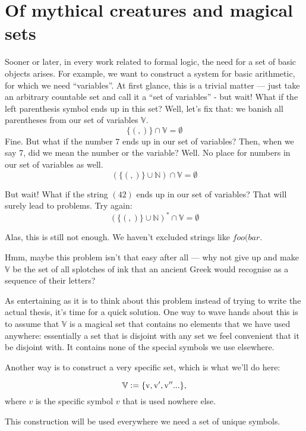 \documentclass[main.tex]{subfiles}
\begin{document}
\section{Of mythical creatures and magical sets}
\label{sec:magic}

Sooner or later, in every work related to formal logic, the need for
a set of basic objects arises. For example, we want to construct a system for basic
arithmetic, for which we need ``variables''.
At first glance, this is a trivial matter --- just take an arbitrary countable
set and call it a ``set of variables'' - but wait! What if the left parenthesis
symbol ends up in this set? Well, let's fix that: we banish all parentheses
from our set of variables $\mathbb{V}$.
\[ \{ (, ) \} \cap \mathbb{V} = \emptyset \]
Fine. But what if the number $7$ ends up in our set of variables? Then,
when we say 7, did we mean the number or the variable? Well. No place for
numbers in our set of variables as well.
\[ ( \{ (, ) \} \cup \mathbb{N} ) \cap \mathbb{V} = \emptyset \]

But wait! What if the string $(42)$ ends up in our set of variables? That will
surely lead to problems. Try again:
\[ ( \{ (, ) \} \cup \mathbb{N} )^* \cap \mathbb{V} = \emptyset \]

Alas, this is still not enough. We haven't excluded strings like $foo(bar$.

Hmm, maybe this problem isn't that easy after all --- why not give up and make
$\mathbb{V}$ be the set of all splotches of ink that an ancient Greek would
recognise as a sequence of their letters?

As entertaining as it is to think about this problem instead of trying to write
the actual thesis, it's time for a quick solution. One way to wave hands
about this is to assume that $\mathbb{V}$ is a magical set that contains
no elements that we have used anywhere: essentially a set that is disjoint
with any set we feel convenient that it be disjoint with. It contains none of
the special symbols we use elsewhere.

Another way is to construct a very specific set, which is what we'll do here:

\[ \mathbb{V} \vcentcolon= \{ \mathrm{v}, \mathrm{v'}, \mathrm{v''} ... \}, \]
where $v$ is the specific symbol $v$ that is used nowhere else.

This construction will be used everywhere we need a set of unique symbols.
\end{document}
